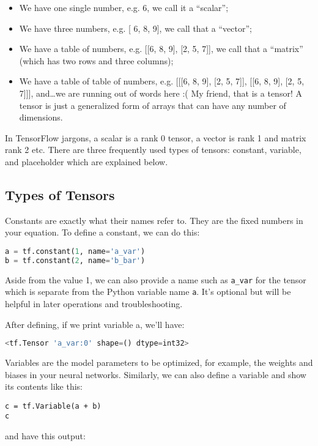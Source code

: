\begin{itemize}
\item We have one single number, e.g. 6, we call it a ``scalar'';
\item We have three numbers, e.g. [ 6, 8, 9], we call that a ``vector'';
\item We have a table of numbers, e.g. [[6, 8, 9], [2, 5, 7]], we call that a ``matrix'' (which has two rows and three columns);
\item We have a table of table of numbers, e.g. [[[6, 8, 9], [2, 5, 7]], [[6, 8, 9], [2, 5, 7]]], and…we are running out of words here :( My friend, that is a tensor! A tensor is just a generalized form of arrays that can have any number of dimensions.
\end{itemize}

In TensorFlow jargons, a scalar is a rank 0 tensor, a vector is rank 1 and matrix rank 2 etc. There are three frequently used types of tensors: constant, variable, and placeholder which are explained below.

\subsection{Types of Tensors}

Constants are exactly what their names refer to. They are the fixed numbers in your equation. To define a constant, we can do this:

\begin{lstlisting}[language=Python]
a = tf.constant(1, name='a_var')
b = tf.constant(2, name='b_bar')
\end{lstlisting}
Aside from the value 1, we can also provide a name such as \lstinline{a_var} for the tensor which is separate from the Python variable name \lstinline{a}. It's optional but will be helpful in later operations and troubleshooting.

After defining, if we print variable a, we'll have:

\begin{lstlisting}[language=Python]
<tf.Tensor 'a_var:0' shape=() dtype=int32>
\end{lstlisting}
Variables are the model parameters to be optimized, for example, the weights and biases in your neural networks. Similarly, we can also define a variable and show its contents like this:

\begin{lstlisting}
c = tf.Variable(a + b)
c
\end{lstlisting}
and have this output:

